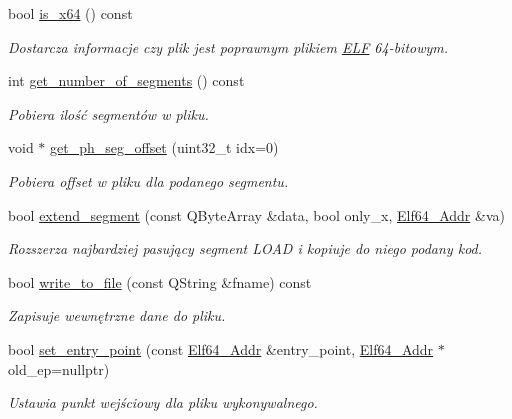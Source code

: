 \begin{DoxyCompactItemize}
bool \hyperlink{class_e_l_f_a558b2f169db21b21b24d6ff19c38ac9e}{is\-\_\-x64} () const 
\begin{DoxyCompactList}\small\item\em Dostarcza informacje czy plik jest poprawnym plikiem \hyperlink{class_e_l_f}{E\-L\-F} 64-\/bitowym. \end{DoxyCompactList}\item 
int \hyperlink{class_e_l_f_a8b65b7ea1b57aa25d3171a25528a43f8}{get\-\_\-number\-\_\-of\-\_\-segments} () const 
\begin{DoxyCompactList}\small\item\em Pobiera ilość segmentów w pliku. \end{DoxyCompactList}\item 
void $\ast$ \hyperlink{class_e_l_f_abdddb77f2822c068b2ae06e221ae1e10}{get\-\_\-ph\-\_\-seg\-\_\-offset} (uint32\-\_\-t idx=0)
\begin{DoxyCompactList}\small\item\em Pobiera offset w pliku dla podanego segmentu. \end{DoxyCompactList}\item 
bool \hyperlink{class_e_l_f_a11f004629212a5651dd4ca1355a7eb9d}{extend\-\_\-segment} (const Q\-Byte\-Array \&data, bool only\-\_\-x, \hyperlink{elf_8h_aeed51d08e3a950d637f8ec1f0cd4ef65}{Elf64\-\_\-\-Addr} \&va)
\begin{DoxyCompactList}\small\item\em Rozszerza najbardziej pasujący segment L\-O\-A\-D i kopiuje do niego podany kod. \end{DoxyCompactList}\item 
bool \hyperlink{class_e_l_f_a52b09dc778fd67aa92d1a80a96e9f580}{write\-\_\-to\-\_\-file} (const Q\-String \&fname) const 
\begin{DoxyCompactList}\small\item\em Zapisuje wewnętrzne dane do pliku. \end{DoxyCompactList}\item 
bool \hyperlink{class_e_l_f_a8342542081d52e5518356f0f6cde3db8}{set\-\_\-entry\-\_\-point} (const \hyperlink{elf_8h_aeed51d08e3a950d637f8ec1f0cd4ef65}{Elf64\-\_\-\-Addr} \&entry\-\_\-point, \hyperlink{elf_8h_aeed51d08e3a950d637f8ec1f0cd4ef65}{Elf64\-\_\-\-Addr} $\ast$old\-\_\-ep=nullptr)
\begin{DoxyCompactList}\small\item\em Ustawia punkt wejściowy dla pliku wykonywalnego. \end{DoxyCompactList}\item 

\end{DoxyCompactItemize}
